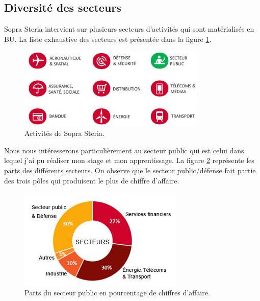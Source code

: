 \documentclass[12pt,a4paper]{article}
\begin{document}
\subsection{Diversité des secteurs}
Sopra Steria intervient sur plusieurs secteurs d’activités qui sont matérialisés en \gls{BU}. La liste exhaustive des secteurs est présentée dans la figure \ref{secteurs}.
\smallbreak
\begin{figure}[H]
	\begin{center}		\includegraphics[width=0.80\textwidth,height=0.80\textheight,keepaspectratio]{secteursActivites.png}
		\caption{Activités de Sopra Steria.}
		\label{secteurs}
	\end{center}
\end{figure}
Nous nous intéresserons particulièrement au secteur public qui est celui dans lequel j'ai pu réaliser mon stage et mon apprentissage. La figure \ref{parts} représente les parts des différents secteurs. On observe que le secteur public/défense fait partie des trois pôles qui produisent le plus de chiffre d'affaire.
\smallbreak
\begin{figure}[H]
	\begin{center}	\includegraphics[width=0.7\textwidth,height=0.8\textheight,keepaspectratio]{secteursSopra.png}
		\caption{Parts du secteur public en pourcentage de chiffres d'affaire.}
		\label{parts}
	\end{center}
\end{figure}
\clearpage
\newpage
\end{document}

